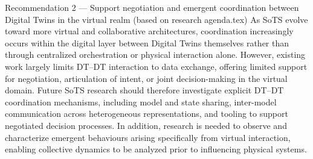 



Recommendation 2 — Support negotiation and emergent coordination between Digital Twins in the virtual realm (based on research agenda.tex)
As SoTS evolve toward more virtual and collaborative architectures, coordination increasingly occurs within the digital layer between Digital Twins themselves rather than through centralized orchestration or physical interaction alone. However, existing work largely limits DT–DT interaction to data exchange, offering limited support for negotiation, articulation of intent, or joint decision-making in the virtual domain. Future SoTS research should therefore investigate explicit DT–DT coordination mechanisms, including model and state sharing, inter-model communication across heterogeneous representations, and tooling to support negotiated decision processes. In addition, research is needed to observe and characterize emergent behaviours arising specifically from virtual interaction, enabling collective dynamics to be analyzed prior to influencing physical systems.


